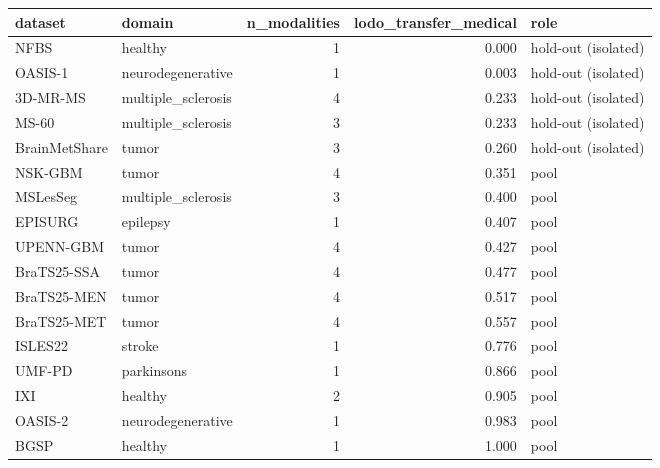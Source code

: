 \begin{tabular}{llrrl}
\toprule
dataset & domain & n\_modalities & lodo\_transfer\_medical & role \\
\midrule
NFBS & healthy & 1 & 0.000 & hold-out (isolated) \\
OASIS-1 & neurodegenerative & 1 & 0.003 & hold-out (isolated) \\
3D-MR-MS & multiple\_sclerosis & 4 & 0.233 & hold-out (isolated) \\
MS-60 & multiple\_sclerosis & 3 & 0.233 & hold-out (isolated) \\
BrainMetShare & tumor & 3 & 0.260 & hold-out (isolated) \\
NSK-GBM & tumor & 4 & 0.351 & pool \\
MSLesSeg & multiple\_sclerosis & 3 & 0.400 & pool \\
EPISURG & epilepsy & 1 & 0.407 & pool \\
UPENN-GBM & tumor & 4 & 0.427 & pool \\
BraTS25-SSA & tumor & 4 & 0.477 & pool \\
BraTS25-MEN & tumor & 4 & 0.517 & pool \\
BraTS25-MET & tumor & 4 & 0.557 & pool \\
ISLES22 & stroke & 1 & 0.776 & pool \\
UMF-PD & parkinsons & 1 & 0.866 & pool \\
IXI & healthy & 2 & 0.905 & pool \\
OASIS-2 & neurodegenerative & 1 & 0.983 & pool \\
BGSP & healthy & 1 & 1.000 & pool \\
\bottomrule
\end{tabular}
